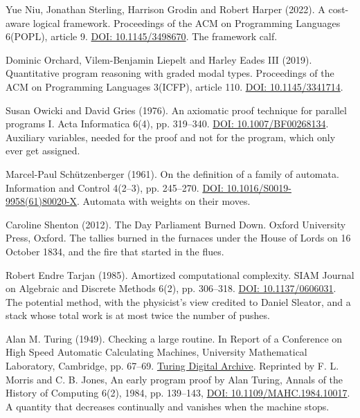 \documentclass[11pt,twoside]{article}
\theoremstyle{thielethm}
\theoremstyle{thieledef}
\theoremstyle{thieledef}
\theoremstyle{thieledef}
\theoremstyle{thielethm}
\theoremstyle{thieleobs}
\theoremstyle{thielethm}
\begin{document}
\noindent Yue Niu, Jonathan Sterling, Harrison Grodin and Robert Harper (2022). A cost-aware logical framework. Proceedings of the ACM on Programming Languages 6(POPL), article 9. \href{https://doi.org/10.1145/3498670}{DOI: 10.1145/3498670}. The framework calf.
\par\medskip

\noindent Dominic Orchard, Vilem-Benjamin Liepelt and Harley Eades III (2019). Quantitative program reasoning with graded modal types. Proceedings of the ACM on Programming Languages 3(ICFP), article 110. \href{https://doi.org/10.1145/3341714}{DOI: 10.1145/3341714}.
\par\medskip

\noindent Susan Owicki and David Gries (1976). An axiomatic proof technique for parallel programs I. Acta Informatica 6(4), pp. 319--340. \href{https://doi.org/10.1007/BF00268134}{DOI: 10.1007/BF00268134}. Auxiliary variables, needed for the proof and not for the program, which only ever get assigned.
\par\medskip

\noindent Marcel-Paul Sch\"utzenberger (1961). On the definition of a family of automata. Information and Control 4(2--3), pp. 245--270. \href{https://doi.org/10.1016/S0019-9958(61)80020-X}{DOI: 10.1016/S0019-9958(61)80020-X}. Automata with weights on their moves.
\par\medskip

\noindent Caroline Shenton (2012). The Day Parliament Burned Down. Oxford University Press, Oxford. The tallies burned in the furnaces under the House of Lords on 16 October 1834, and the fire that started in the flues.
\par\medskip

\noindent Robert Endre Tarjan (1985). Amortized computational complexity. SIAM Journal on Algebraic and Discrete Methods 6(2), pp. 306--318. \href{https://doi.org/10.1137/0606031}{DOI: 10.1137/0606031}. The potential method, with the physicist's view credited to Daniel Sleator, and a stack whose total work is at most twice the number of pushes.
\par\medskip

\noindent Alan M. Turing (1949). Checking a large routine. In Report of a Conference on High Speed Automatic Calculating Machines, University Mathematical Laboratory, Cambridge, pp. 67--69. \href{https://turingarchive.kings.cam.ac.uk/publications-lectures-and-talks-amtb/amt-b-8}{Turing Digital Archive}. Reprinted by F. L. Morris and C. B. Jones, An early program proof by Alan Turing, Annals of the History of Computing 6(2), 1984, pp. 139--143, \href{https://doi.org/10.1109/MAHC.1984.10017}{DOI: 10.1109/MAHC.1984.10017}. A quantity that decreases continually and vanishes when the machine stops.
\par\medskip
\end{document}
